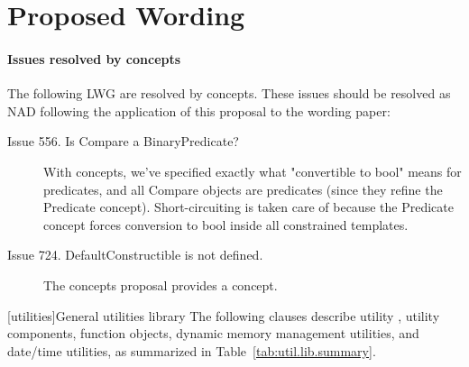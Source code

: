 \documentclass[american,twoside]{book}
\begin{document}
\section*{Proposed Wording}
\paragraph*{Issues resolved by concepts}
The following LWG are resolved by concepts. These issues should be
resolved as NAD following the application of this proposal to the
wording paper:
\begin{description}
\item[Issue 556. Is Compare a BinaryPredicate?] With concepts, we've
  specified exactly what "convertible to bool" means for predicates,
  and all Compare objects are predicates (since they refine the
  Predicate concept). Short-circuiting is taken care of because the
  Predicate concept forces conversion to bool inside all constrained
  templates.
\item[Issue 724. DefaultConstructible is not defined.]
The concepts proposal provides a  concept.
\end{description}

\pagestyle{fancy}
\fancyhead[LE,RO]{\textbf{\rightmark}}
\fancyhead[RE]{\textbf{\leftmark\hspace{1em}\thepage}}
\fancyhead[LO]{\textbf{\thepage\hspace{1em}\leftmark}}


\renewcommand{\sectionmark}[1]{\markright{\thesection\hspace{1em}#1}}
\renewcommand{\chaptermark}[1]{\markboth{#1}{}}

\setcounter{chapter}{19}
[utilities]{General utilities library}
\setcounter{Paras}{1}
\textcolor{black}{\pnum}
The following clauses describe utility  , utility
components,  function objects, dynamic
memory management utilities, and date/time utilities, as summarized in
Table~\ref{tab:util.lib.summary}.
\end{document}
